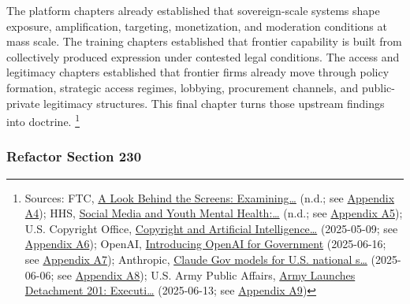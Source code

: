 \documentclass[
  american,
  11pt,
  letterpaper,
]{article}
\begin{document}
The platform chapters already established that sovereign-scale systems
shape exposure, amplification, targeting, monetization, and moderation
conditions at mass scale. The training chapters established that
frontier capability is built from collectively produced expression under
contested legal conditions. The access and legitimacy chapters
established that frontier firms already move through policy formation,
strategic access regimes, lobbying, procurement channels, and
public-private legitimacy structures. This final chapter turns those
upstream findings into doctrine. \footnote{Sources: FTC,
  \href{https://www.ftc.gov/reports/look-behind-screens-examining-data-practices-social-media-video-streaming-services}{A
  Look Behind the Screens: Examining\ldots{}} (n.d.; see
  \hyperref[ch-10-appendix-a4-a-look-behind-the-screens-examining-the-data-practices-of-social-media-and-video-streaming-services]{Appendix
  A4}); HHS,
  \href{https://www.hhs.gov/surgeongeneral/priorities/youth-mental-health/social-media/index.html}{Social
  Media and Youth Mental Health:\ldots{}} (n.d.; see
  \hyperref[ch-10-appendix-a5-social-media-and-youth-mental-health-the-u-s-surgeon-general-s-advisory]{Appendix
  A5}); U.S. Copyright Office,
  \href{https://copyright.gov/ai/Copyright-and-Artificial-Intelligence-Part-3-Generative-AI-Training-Report-Pre-Publication-Version.pdf}{Copyright
  and Artificial Intelligence\ldots{}} (2025-05-09; see
  \hyperref[ch-10-appendix-a6-copyright-and-artificial-intelligence-part-3-generative-ai-training-pre-publication-version]{Appendix
  A6}); OpenAI,
  \href{https://openai.com/global-affairs/introducing-openai-for-government/}{Introducing
  OpenAI for Government} (2025-06-16; see
  \hyperref[ch-10-appendix-a7-introducing-openai-for-government]{Appendix
  A7}); Anthropic,
  \href{https://www.anthropic.com/news/claude-gov-models-for-u-s-national-security-customers}{Claude
  Gov models for U.S. national s\ldots{}} (2025-06-06; see
  \hyperref[ch-10-appendix-a8-claude-gov-models-for-u-s-national-security-customers]{Appendix
  A8}); U.S. Army Public Affairs,
  \href{https://www.army.mil/article/286317/army_launches_detachment_201_executive_innovation_corps_to_drive_tech_transformation}{Army
  Launches Detachment 201: Executi\ldots{}} (2025-06-13; see
  \hyperref[ch-10-appendix-a9-army-launches-detachment-201-executive-innovation-corps-to-drive-tech-transformation]{Appendix
  A9})}

\subsubsection{Refactor Section 230}\label{refactor-section-230}
\end{document}

